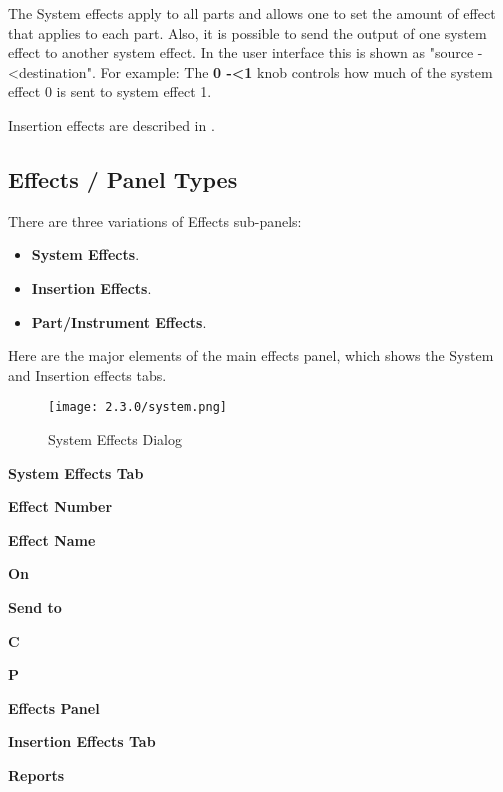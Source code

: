    The System effects apply to all parts and allows one to set the amount of
   effect that applies to each part. Also, it is possible to send the output
   of one system effect to another system effect. In the user interface this
   is shown as "source -\textless destination". For example:
   The \textbf{0 -\textless 1} knob controls how
   much of the system effect 0 is sent to system effect 1.

   Insertion effects are described in
   .

\subsection{Effects / Panel Types}
\label{subsec:effects_paneltypes}

   There are three variations of Effects sub-panels:

   \begin{itemize}
      \item \textbf{System Effects}.
      \item \textbf{Insertion Effects}.
      \item \textbf{Part/Instrument Effects}.
   \end{itemize}

   Here are the major elements of the main effects panel, which shows the
   System and Insertion effects tabs.

\begin{figure}[H]
   \centering
   \texttt{[image: 2.3.0/system.png]}
   \caption{System Effects Dialog}
   \label{fig:system_effects_dialog}
\end{figure}

   \begin{enumber}
      \item \textbf{System Effects Tab}
      \item \textbf{Effect Number}
      \item \textbf{Effect Name}
      \item \textbf{On}
      \item \textbf{Send to}
      \item \textbf{C}
      \item \textbf{P}
      \item \textbf{Effects Panel}
      \item \textbf{Insertion Effects Tab}
      \item \textbf{Reports}
   \end{enumber}

